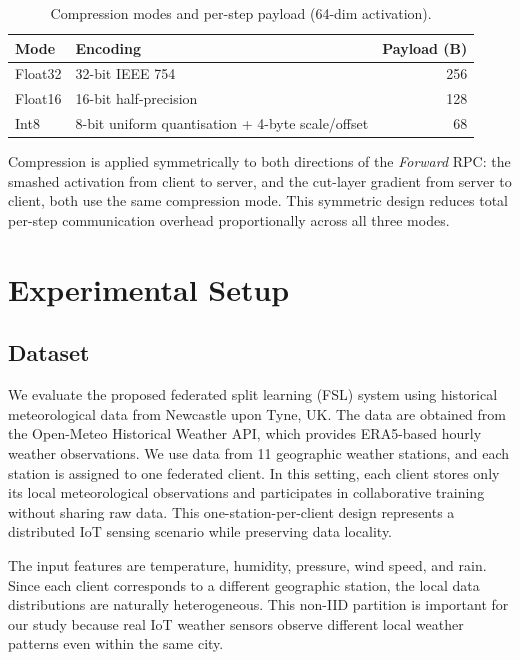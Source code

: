 \documentclass[conference]{IEEEtran}
\begin{document}
\begin{table}[H]
\centering
\caption{Compression modes and per-step payload (64-dim activation).}
\label{tab:compression_modes}
\small
\begin{tabularx}{\columnwidth}{lXr}
\toprule
\textbf{Mode} & \textbf{Encoding} & \textbf{Payload (B)} \\
\midrule
Float32 & 32-bit IEEE 754                                   & 256 \\
Float16 & 16-bit half-precision                            & 128 \\
Int8    & 8-bit uniform quantisation + 4-byte scale/offset &  68 \\
\bottomrule
\end{tabularx}
\end{table}

Compression is applied symmetrically to both directions of the \textit{Forward} RPC: the smashed activation from client to server, and the cut-layer gradient from server to client, both use the same compression mode. This symmetric design reduces total per-step communication overhead proportionally across all three modes.

\section{Experimental Setup}
\label{sec:experimental_setup}

\subsection{Dataset}
\label{subsec:dataset}

We evaluate the proposed federated split learning (FSL) system using historical meteorological data from Newcastle upon Tyne, UK. The data are obtained from the Open-Meteo Historical Weather API, which provides ERA5-based hourly weather observations. We use data from 11 geographic weather stations, and each station is assigned to one federated client. In this setting, each client stores only its local meteorological observations and participates in collaborative training without sharing raw data. This one-station-per-client design represents a distributed IoT sensing scenario while preserving data locality.

The input features are temperature, humidity, pressure, wind speed, and rain. Since each client corresponds to a different geographic station, the local data distributions are naturally heterogeneous. This non-IID partition is important for our study because real IoT weather sensors observe different local weather patterns even within the same city.
\end{document}
